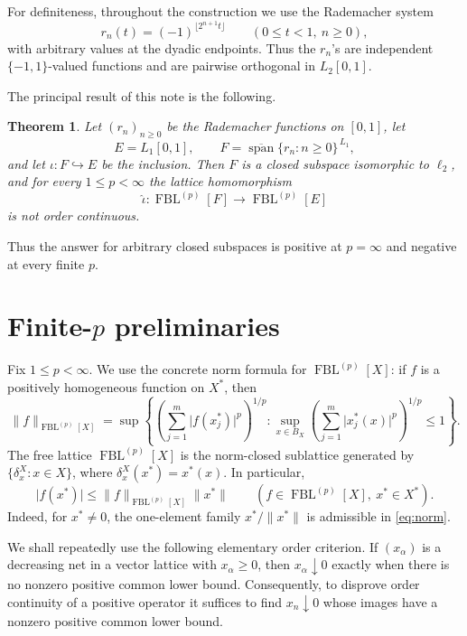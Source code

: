 \documentclass[11pt]{article}
\newtheorem{theorem}{Theorem}[section]
\theoremstyle{remark}
\newcommand{\FBL}[2]{\operatorname{FBL}^{(#1)}[#2]}
\newcommand{\wh}[1]{\widehat{#1}}
\newcommand{\abs}[1]{\lvert #1\rvert}
\newcommand{\norm}[1]{\lVert #1\rVert}
\begin{document}
For definiteness, throughout the construction we use the Rademacher system
\[
  r_n(t)=(-1)^{\lfloor 2^{n+1}t\rfloor}\qquad(0\le t<1,\ n\ge0),
\]
with arbitrary values at the dyadic endpoints.  Thus the \(r_n\)'s are
independent \(\{-1,1\}\)-valued functions and are pairwise orthogonal in
\(L_2[0,1]\).

The principal result of this note is the following.

\begin{theorem}\label{thm:main}
Let \((r_n)_{n\ge0}\) be the Rademacher functions on \([0,1]\), let
\[
  E=L_1[0,1],
  \qquad
  F=\overline{\operatorname{span}}\{r_n:n\ge0\}^{\,L_1},
\]
and let \(\iota:F\hookrightarrow E\) be the inclusion.  Then \(F\) is a
closed subspace isomorphic to \(\ell_2\), and for every
\(1\le p<\infty\) the lattice homomorphism
\[
  \wh\iota:\FBL{p}{F}\longrightarrow\FBL{p}{E}
\]
is not order continuous.
\end{theorem}

Thus the answer for arbitrary closed subspaces is positive at
\(p=\infty\) and negative at every finite \(p\).

\section{Finite-\texorpdfstring{\(p\)}{p} preliminaries}

Fix \(1\le p<\infty\).  We use the concrete norm formula for
\(\FBL{p}{X}\): if \(f\) is a positively homogeneous function on \(X^*\),
then
\begin{equation}\label{eq:norm}
 \norm{f}_{\FBL{p}{X}}
 =\sup\left\{
   \left(\sum_{j=1}^m \abs{f(x_j^*)}^p\right)^{1/p}:
   \sup_{x\in B_X}
   \left(\sum_{j=1}^m\abs{x_j^*(x)}^p\right)^{1/p}\le1
 \right\}.
\end{equation}
The free lattice \(\FBL{p}{X}\) is the norm-closed sublattice generated by
\(\{\delta_x^X:x\in X\}\), where
\(\delta_x^X(x^*)=x^*(x)\).  In particular,
\begin{equation}\label{eq:evaluation}
  \abs{f(x^*)}\le \norm{f}_{\FBL{p}{X}}\norm{x^*}
  \qquad(f\in\FBL{p}{X},\ x^*\in X^*).
\end{equation}
Indeed, for \(x^*\ne0\), the one-element family
\(x^*/\norm{x^*}\) is admissible in \eqref{eq:norm}.

We shall repeatedly use the following elementary order criterion.  If
\((x_\alpha)\) is a decreasing net in a vector lattice with \(x_\alpha\ge0\),
then \(x_\alpha\downarrow0\) exactly when there is no nonzero positive
common lower bound.  Consequently, to disprove order continuity of a positive
operator it suffices to find \(x_n\downarrow0\) whose images have a nonzero
positive common lower bound.
\end{document}
